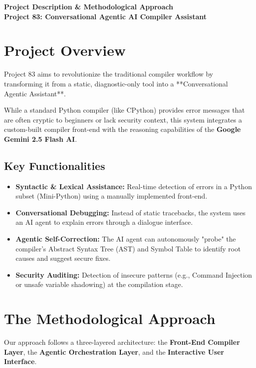 \documentclass[a4paper,12pt]{article}
\begin{document}
\begin{center}
    \LARGE \textbf{Project Description \& Methodological Approach} \\
    \vspace{2mm}
    \large \textbf{Project 83: Conversational Agentic AI Compiler Assistant}
\end{center}

\section{Project Overview}
Project 83 aims to revolutionize the traditional compiler workflow by transforming it from a static, diagnostic-only tool into a **Conversational Agentic Assistant**. 

While a standard Python compiler (like CPython) provides error messages that are often cryptic to beginners or lack security context, this system integrates a custom-built compiler front-end with the reasoning capabilities of the \textbf{Google Gemini 2.5 Flash AI}.

\subsection{Key Functionalities}
\begin{itemize}
    \item \textbf{Syntactic \& Lexical Assistance:} Real-time detection of errors in a Python subset (Mini-Python) using a manually implemented front-end.
    \item \textbf{Conversational Debugging:} Instead of static tracebacks, the system uses an AI agent to explain errors through a dialogue interface.
    \item \textbf{Agentic Self-Correction:} The AI agent can autonomously "probe" the compiler's Abstract Syntax Tree (AST) and Symbol Table to identify root causes and suggest secure fixes.
    \item \textbf{Security Auditing:} Detection of insecure patterns (e.g., Command Injection or unsafe variable shadowing) at the compilation stage.
\end{itemize}

\section{The Methodological Approach}
Our approach follows a three-layered architecture: the \textbf{Front-End Compiler Layer}, the \textbf{Agentic Orchestration Layer}, and the \textbf{Interactive User Interface}.
\end{document}

